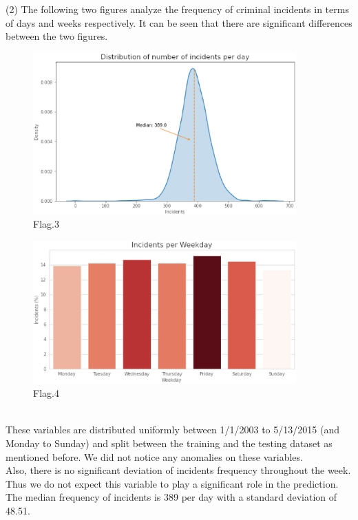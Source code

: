 (2)
The following two figures analyze the frequency of criminal incidents in terms of
 days and weeks respectively. It can be seen that there are significant differences 
 between the two figures.
\begin{center}
  \begin{figure}[htbp]
    \centering
    \begin{minipage}[t]{0.48\textwidth}
      \centering
      \includegraphics[width=0.9\textwidth]{kaggle/7.1.eps}
      {\small{Flag.3}}
    \end{minipage}
    \begin{minipage}[t]{0.48\textwidth}
      \centering
      \includegraphics[width=0.9\textwidth]{kaggle/8.1.eps}
      {\small{Flag.4}}
    \end{minipage}
  \end{figure}
  \hfill
  \\
  These variables are distributed uniformly between 1/1/2003 to 5/13/2015
   (and Monday to Sunday) and split between the training and the testing dataset as mentioned before. We did not 
   notice any anomalies on these variables.
   \\
   Also, there is no significant deviation of incidents frequency throughout the week. Thus 
   we do not expect this variable
    to play a significant role in the prediction.
The median frequency of incidents is 389 per day with a standard deviation of 48.51.
\end{center}


